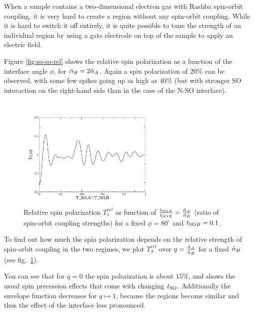 When a sample contains a two-dimensional electron gas with Rashba spin-orbit
coupling, it is very hard to create a region without any spin-orbit coupling.
While it is hard to switch it off entirely, it is quite possible to tune the
strength of an individual region by using a gate electrode on top of the
sample to apply an electric field.

Figure \ref{fig:so-so-rel} shows the relative spin polarization as a function
of the interface angle $\phi$, for $\tilde \alpha_B = 2 \tilde \alpha_A$. Again a spin
polarization of $20\%$ can be observed, with some few spikes going up as high
as $40\%$ (but with stronger SO interaction on the right-hand side than in the
case of the N-SO interface).

\begin{figure}[htb]
    \begin{center}
        \includegraphics[width=0.7\textwidth]{polarization-so-so-rel.pdf}
    \end{center}
    \caption{Relative spin polarization $T_s^{rel}$ as function of
        $ \frac{t_{\textnormal{SO}}{}_A}{t_{\textnormal{SO}}{}_B} =\frac{\tilde \alpha_A}{\tilde \alpha_B}$ (ratio of spin-orbit
        coupling strengths) for a fixed
        $\phi=80^\circ$ and $t_{\textnormal{SO}}{}_B = 0.1$.
    }
    \label{fig:pol-so-so-rel}
\end{figure}

To find out how much the spin polarization depends on the relative strength of
spin-orbit coupling in the two regimes, we plot $T_S^{rel}$ over $q
=\frac{\tilde \alpha_A}{\tilde \alpha_B}$ for a fixed $\tilde \alpha_B$ (see fig.~\ref{fig:pol-so-so-rel}).

You can see that for $q = 0$ the spin polarization is about $15\%$, and shows
the usual spin precession effects that come with changing $t_{\textnormal{SO}}$. Additionally
the envelope function decreases for $q \mapsto 1$, because the regions become
similar and thus the effect of the interface less pronounced.

